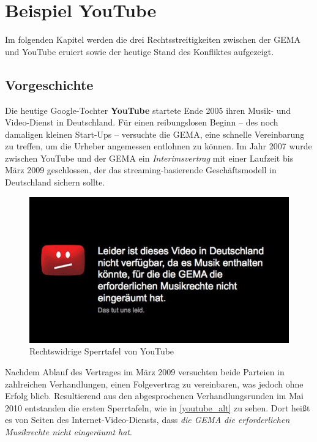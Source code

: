 \chapter{Beispiel YouTube}

Im folgenden Kapitel werden die drei Rechtsstreitigkeiten zwischen der GEMA und YouTube eruiert sowie der heutige Stand des Konfliktes aufgezeigt.

\section{Vorgeschichte}
Die heutige Google-Tochter \textbf{YouTube} startete Ende 2005 ihren Musik- und Video-Dienst in Deutschland. Für einen reibungslosen Beginn -- des noch damaligen kleinen Start-Ups -- versuchte die GEMA, eine schnelle Vereinbarung zu treffen, um die Urheber angemessen entlohnen zu können. Im Jahr 2007 wurde zwischen YouTube und der GEMA ein \textit{Interimsvertrag} mit einer Laufzeit bis März 2009 geschlossen, der das streaming-basierende Geschäftsmodell in Deutschland sichern sollte.

\begin{figure}[H]
\centering
\includegraphics[scale=0.94]{se-wa-jpg/youtube_heise}
\caption[Rechtswidrige Sperrtafel von YouTube]{Rechtswidrige Sperrtafel von YouTube\protect\footnotemark}
\label{youtube_alt}
\end{figure}

Nachdem Ablauf des Vertrages im März 2009 versuchten beide Parteien in zahlreichen Verhandlungen, einen Folgevertrag zu vereinbaren, was jedoch ohne Erfolg blieb. Resultierend aus den abgesprochenen Verhandlungsrunden im Mai 2010 entstanden die ersten Sperrtafeln, wie in \vref{youtube_alt} zu sehen. Dort heißt es von Seiten des Internet-Video-Diensts, dass \textit{die GEMA die erforderlichen Musikrechte nicht eingeräumt hat}. 

